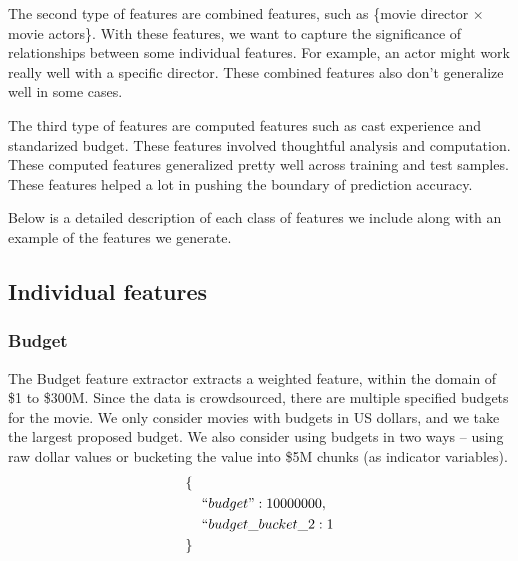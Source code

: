 \documentclass[journal]{IEEEtran}
\begin{document}
\par The second type of features are combined features, such as \{movie director $\times$ movie actors\}. With these features, we want to capture the significance of relationships between some individual features. For example, an actor might work really well with a specific director. These combined features also don't generalize well in some cases.

\par The third type of features are computed features such as cast experience and standarized budget. These features involved thoughtful analysis and computation. These computed features generalized pretty well across training and test samples. These features helped a lot in pushing the boundary of prediction accuracy.

\par Below is a detailed description of each class of features we include along with an example of the features we generate.

\subsection{Individual features}
\subsubsection{Budget}
The Budget feature extractor extracts a weighted feature, within the domain of
\$1 to \$300M.  Since the data is crowdsourced, there are multiple specified
budgets for the movie.  We only consider movies with budgets in US dollars, and
we take the largest proposed budget.  We also consider using budgets in two
ways -- using raw dollar values or bucketing the value into \$5M chunks (as
indicator variables).
\begin{align*}
        \{ \ \ & \\
        &``budget": 10000000,\\
        &``budget\_bucket\_2: 1\\
        \} \ \ &
\end{align*}
\end{document}
